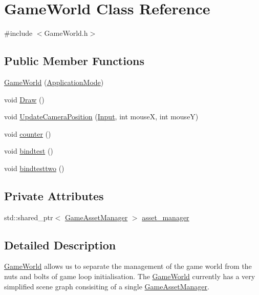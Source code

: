\hypertarget{class_game_world}{}\section{Game\+World Class Reference}
\label{class_game_world}


{\ttfamily \#include $<$Game\+World.\+h$>$}

\subsection*{Public Member Functions}
\begin{DoxyCompactItemize}
\item 
\hyperlink{class_game_world_a17a84e57a80600961088afc753036f89}{Game\+World} (\hyperlink{common_8h_add86e7c88dd109abea3f708b422f31f0}{Application\+Mode})
\item 
void \hyperlink{class_game_world_a275418607d8286979b276f165ad5876b}{Draw} ()
\item 
void \hyperlink{class_game_world_aa934714929b8b3bcf322f1ec4695d75b}{Update\+Camera\+Position} (\hyperlink{common_8h_a080a822f0093973313bd644e517a5090}{Input}, int mouse\+X, int mouse\+Y)
\item 
void \hyperlink{class_game_world_a850d262d63a4c1b83a45094ea9e21dd1}{counter} ()
\item 
void \hyperlink{class_game_world_a28490fa8778ebff7959bb32628e651da}{bindtest} ()
\item 
void \hyperlink{class_game_world_a298058626f3cd353d8eeac592620080c}{bindtesttwo} ()
\end{DoxyCompactItemize}
\subsection*{Private Attributes}
\begin{DoxyCompactItemize}
\item 
std\+::shared\+\_\+ptr$<$ \hyperlink{class_game_asset_manager}{Game\+Asset\+Manager} $>$ \hyperlink{class_game_world_aec5c0bca4fb5a41e4aac2dce2871266d}{asset\+\_\+manager}
\end{DoxyCompactItemize}


\subsection{Detailed Description}
\hyperlink{class_game_world}{Game\+World} allows us to separate the management of the game world from the nuts and bolts of game loop initialisation. The \hyperlink{class_game_world}{Game\+World} currently has a very simplified scene graph consisiting of a single \hyperlink{class_game_asset_manager}{Game\+Asset\+Manager}. 

